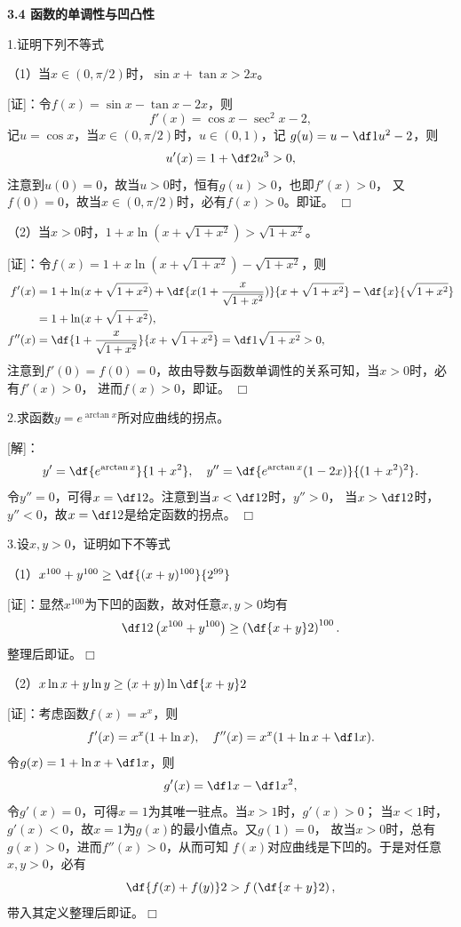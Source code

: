 \begin{center}
	\bf 3.4 函数的单调性与凹凸性
\end{center}

\bigskip

1.证明下列不等式

（1）当$x\in(0,\pi/2)$时，$\sin x+\tan x>2x$。

[证]：令$f(x)=\sin x-\tan x-2x$，则
$$f'(x)=\cos x-\sec^2x-2,$$
记$u=\cos x$，当$x\in(0,\pi/2)$时，$u\in(0,1)$，记
$g(u)=u-\df1{u^2}-2$，则
$$u'(x)=1+\df2{u^3}>0,$$
注意到$u(0)=0$，故当$u>0$时，恒有$g(u)>0$，也即$f'(x)>0$，
又$f(0)=0$，故当$x\in(0,\pi/2)$时，必有$f(x)>0$。即证。
\hfill$\Box$

\bigskip

（2）当$x>0$时，$1+x\ln(x+\sqrt{1+x^2})>\sqrt{1+x^2}$。

[证]：令$f(x)=1+x\ln(x+\sqrt{1+x^2})-\sqrt{1+x^2}$，则
\begin{align*}
	f'(x)&=1+\ln(x+\sqrt{1+x^2})+\df{x(1+\frac{x}{\sqrt{1+x^2}})}
	{x+\sqrt{1+x^2}}-\df{x}{\sqrt{1+x^2}}\\
	&=1+\ln(x+\sqrt{1+x^2}),\\
	f''(x)&=\df{1+\frac{x}{\sqrt{1+x^2}}}{x+\sqrt{1+x^2}}=\df1{\sqrt{1+x^2}}>0,
\end{align*}
注意到$f'(0)=f(0)=0$，故由导数与函数单调性的关系可知，当$x>0$时，必有$f'(x)>0$，
进而$f(x)>0$，即证。
\hfill$\Box$

\bigskip

2.求函数$y=e^{\arctan x}$所对应曲线的拐点。

[解]：
$$y'=\df{e^{\arctan x}}{1+x^2},\quad
y''=\df{e^{\arctan x}(1-2x)}{(1+x^2)^2}.$$
令$y''=0$，可得$x=\df12$。注意到当$x<\df12$时，$y''>0$，
当$x>\df12$时，$y''<0$，故$x=\df12$是给定函数的拐点。
\hfill$\Box$

\bigskip

3.设$x,y>0$，证明如下不等式

（1）$x^{100}+y^{100}\geq\df{(x+y)^{100}}{2^{99}}$

[证]：显然$x^{100}$为下凹的函数，故对任意$x,y>0$均有
$$\df12\left(x^{100}+y^{100}\right)\geq
\left(\df{x+y}2\right)^{100}.$$
整理后即证。\hfill$\Box$

\bigskip

（2）$x\ln x+y\ln y\geq (x+y)\ln\df{x+y}2$

[证]：考虑函数$f(x)=x^x$，则
$$f'(x)=x^x(1+\ln x),\quad
f''(x)=x^x(1+\ln x+\df1x).$$
令$g(x)=1+\ln x+\df1x$，则
$$g'(x)=\df1x-\df1{x^2},$$
令$g'(x)=0$，可得$x=1$为其唯一驻点。当$x>1$时，$g'(x)>0$；
当$x<1$时，$g'(x)<0$，故$x=1$为$g(x)$的最小值点。又$g(1)=0$，
故当$x>0$时，总有$g(x)>0$，进而$f''(x)>0$，从而可知
$f(x)$对应曲线是下凹的。于是对任意$x,y>0$，必有
$$\df{f(x)+f(y)}2>f\left(\df{x+y}2\right),$$
带入其定义整理后即证。\hfill$\Box$

